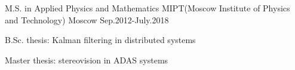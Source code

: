 


\begin{cventries}


\cventry
{M.S. in Applied Physics and Mathematics} %
{MIPT(Moscow Institute of Physics and Technology)} %
{Moscow} %
{Sep.2012-July.2018} %
{ %
\begin{cvitems}
\item {B.Sc. thesis: Kalman filtering in distributed systems}
\item {Master thesis: stereovision in ADAS systems}
\end{cvitems}
}


\end{cventries}